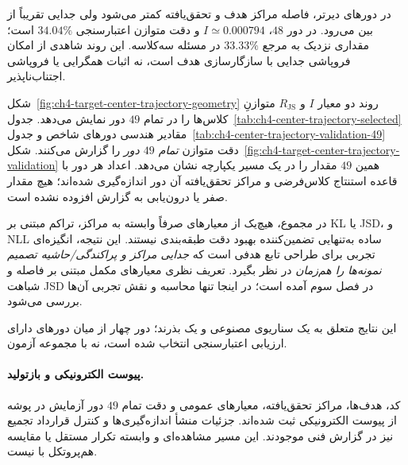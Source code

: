 در دورهای دیرتر، فاصله مراکز هدف و تحقق‌یافته کمتر
می‌شود ولی جدایی تقریباً از بین می‌رود. در دور $48$،
$I\simeq0.000794$ و دقت متوازن اعتبارسنجی
$34.04\%$ است؛ مقداری نزدیک به مرجع $33.33\%$
در مسئله سه‌کلاسه. این روند شاهدی از امکان
فروپاشی جدایی با سازگارسازی هدف است،
نه اثبات همگرایی یا فروپاشی اجتناب‌ناپذیر.

شکل~\ref{fig:ch4-target-center-trajectory-geometry}
روند دو معیار $I$ و $R_{\mathrm{JS}}$
متوازنِ کلاس‌ها را در تمام $49$ دور نمایش می‌دهد.
جدول~\ref{tab:ch4-center-trajectory-selected}
مقادیر هندسی دورهای شاخص و
جدول~\ref{tab:ch4-center-trajectory-validation-49}
دقت متوازن \emph{تمام $49$ دور} را گزارش می‌کنند.
شکل~\ref{fig:ch4-target-center-trajectory-validation}
همین $49$ مقدار را در یک مسیر یکپارچه نشان می‌دهد.
اعداد هر دور با قاعده استنتاج کلاس‌فرضی
و مراکز تحقق‌یافته آن دور اندازه‌گیری شده‌اند؛
هیچ مقدار صفر یا درون‌یابی به گزارش افزوده نشده است.





در مجموع، هیچ‌یک از معیارهای صرفاً وابسته به مراکز، تراکم مبتنی بر KL یا JSD، و NLL ساده به‌تنهایی تضمین‌کننده بهبود دقت طبقه‌بندی نیستند. این نتیجه، انگیزه‌ای تجربی برای طراحی تابع هدفی است که \emph{جدایی مراکز و پراکندگی/حاشیه تصمیم نمونه‌ها را هم‌زمان} در نظر بگیرد. تعریف نظری معیارهای مکمل مبتنی بر فاصله و شباهت JSD در فصل سوم آمده است؛ در اینجا تنها محاسبه و نقش تجربی آن‌ها بررسی می‌شود.

این نتایج متعلق به یک سناریوی مصنوعی و یک بذرند؛ دور چهار از میان دورهای دارای ارزیابی اعتبارسنجی انتخاب شده است، نه با مجموعه آزمون.

\paragraph{پیوست الکترونیکی و بازتولید.}
کد، هدف‌ها، مراکز تحقق‌یافته، معیارهای عمومی و دقت تمام $49$ دور آزمایش  در پوشه  از پیوست الکترونیکی ثبت شده‌اند. جزئیات منشأ اندازه‌گیری‌ها و کنترل قرارداد تجمیع نیز در گزارش فنی موجودند. این مسیر مشاهده‌ای و وابسته تکرار مستقل یا مقایسه هم‌پروتکل با  نیست.



